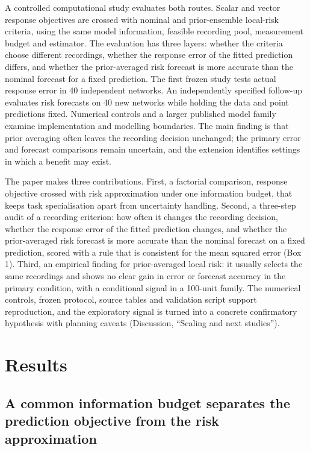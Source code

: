 A controlled computational study evaluates both routes. Scalar and vector response objectives are crossed with nominal and prior-ensemble local-risk criteria, using the same model information, feasible recording pool, measurement budget and estimator. The evaluation has three layers: whether the criteria choose different recordings, whether the response error of the fitted prediction differs, and whether the prior-averaged risk forecast is more accurate than the nominal forecast for a fixed prediction. The first frozen study tests actual response error in 40 independent networks. An independently specified follow-up evaluates risk forecasts on 40 new networks while holding the data and point predictions fixed. Numerical controls and a larger published model family examine implementation and modelling boundaries. The main finding is that prior averaging often leaves the recording decision unchanged; the primary error and forecast comparisons remain uncertain, and the extension identifies settings in which a benefit may exist.

The paper makes three contributions. First, a factorial comparison, response objective crossed with risk approximation under one information budget, that keeps task specialisation apart from uncertainty handling. Second, a three-step audit of a recording criterion: how often it changes the recording decision, whether the response error of the fitted prediction changes, and whether the prior-averaged risk forecast is more accurate than the nominal forecast on a fixed prediction, scored with a rule that is consistent for the mean squared error (Box 1). Third, an empirical finding for prior-averaged local risk: it usually selects the same recordings and shows no clear gain in error or forecast accuracy in the primary condition, with a conditional signal in a 100-unit family. The numerical controls, frozen protocol, source tables and validation script support reproduction, and the exploratory signal is turned into a concrete confirmatory hypothesis with planning caveats (Discussion, ``Scaling and next studies'').

\section{Results}

\subsection{A common information budget separates the prediction objective from the risk approximation}

